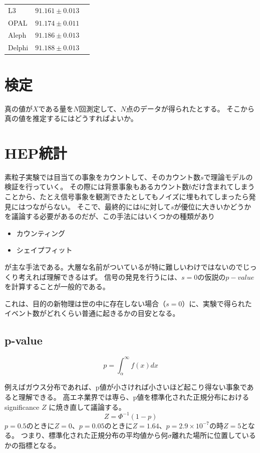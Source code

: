 \documentclass[a4paper,uplatex]{jsreport}
\begin{document}
\begin{table}
  \centering
  \begin{tabular}{lll}
    L3        & $91.161 \pm 0.013$   \\
    OPAL      & $91.174 \pm 0.011$    \\
    Aleph       & $91.186 \pm 0.013$ \\
    Delphi      & $91.188 \pm 0.013$
  \end{tabular}
\end{table}

\chapter{検定}
真の値が$X$である量を$N$回測定して、$N$点のデータが得られたとする。
そこから真の値を推定するにはどうすればよいか。

\chapter{HEP統計}
素粒子実験では目当ての事象をカウントして、そのカウント数$s$で理論モデルの検証を行っていく。
その際には背景事象もあるカウント数$b$だけ含まれてしまうことから、たとえ信号事象を観測できたとしてもノイズに埋もれてしまったら発見にはつながらない。
そこで、最終的には$b$に対して$s$が優位に大きいかどうかを議論する必要があるのだが、この手法にはいくつかの種類があり

\begin{itemize}
  \item カウンティング
  \item シェイプフィット
\end{itemize}

が主な手法である。大層な名前がついているが特に難しいわけではないのでじっくり考えれば理解できるはず。
信号の発見を行うには、$s=0$の仮説の$p-value$を計算することが一般的である。

これは、目的の新物理は世の中に存在しない場合（$s=0$）に、実験で得られたイベント数がどれくらい普通に起きるかの目安となる。

\section{p-value}

\begin{equation}
  p = \int_{\alpha}^{\infty} f(x)dx
\end{equation}

例えばガウス分布であれば、p値が小さければ小さいほど起こり得ない事象であると理解できる。
高エネ業界では専ら、p値を標準化された正規分布におけるsignificance $Z$ に焼き直して議論する。
\begin{equation}
  Z = \Phi^{-1}(1-p)
\end{equation}
$p=0.5$のときに$Z=0$、$p=0.05$のときに$Z=1.64$、$p=2.9\times 10^{-7}$の時$Z=5$となる。
つまり、標準化された正規分布の平均値から何$\sigma$離れた場所に位置しているかの指標となる。
\end{document}
